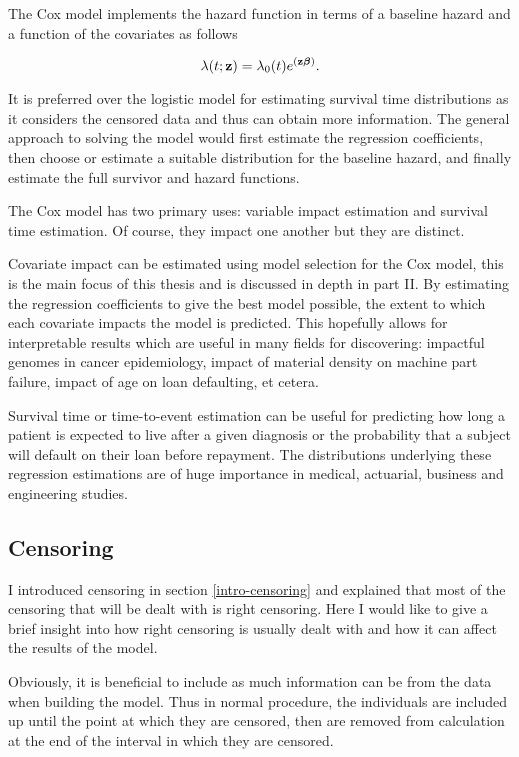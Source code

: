 The Cox model implements the hazard function in terms of a baseline hazard and a function of the covariates as follows

\begin{equation}\label{cox-hazard}
    \lambda(t;\textbf{z})=\lambda_0(t)e^{(\textbf{z}\boldsymbol{\beta})}.
\end{equation}

It is preferred over the logistic model for estimating survival time distributions as it considers the censored data and thus can obtain more information. The general approach to solving the model would first estimate the regression coefficients, then choose or estimate a suitable distribution for the baseline hazard, and finally estimate the full survivor and hazard functions.

The Cox model has two primary uses: variable impact estimation and survival time estimation. Of course, they impact one another but they are distinct.

Covariate impact can be estimated using model selection for the Cox model, this is the main focus of this thesis and is discussed in depth in part II. By estimating the regression coefficients to give the best model possible, the extent to which each covariate impacts the model is predicted. This hopefully allows for interpretable results which are useful in many fields for discovering: impactful genomes in cancer epidemiology, impact of material density on machine part failure, impact of age on loan defaulting, et cetera. 

Survival time or time-to-event estimation can be useful for predicting how long a patient is expected to live after a given diagnosis or the probability that a subject will default on their loan before repayment. The distributions underlying these regression estimations are of huge importance in medical, actuarial, business and engineering studies.

\subsection{Censoring}

I introduced censoring in section \ref{intro-censoring} and explained that most of the censoring that will be dealt with is right censoring. Here I would like to give a brief insight into how right censoring is usually dealt with and how it can affect the results of the model.

Obviously, it is beneficial to include as much information can be from the data when building the model. Thus in normal procedure, the individuals are included up until the point at which they are censored, then are removed from calculation at the end of the interval in which they are censored. 

